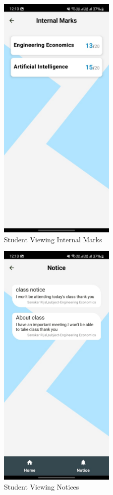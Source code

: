\begin{figure}[H]
    \centering
    \includegraphics[width=0.5\textwidth]{Graphics/output/student_marks.jpg}
    \caption{Student Viewing Internal Marks}
    \label{fig:student_marks}
\end{figure}

\begin{figure}[H]
    \centering
    \includegraphics[width=0.5\textwidth]{Graphics/output/student_notices.jpg}
    \caption{Student Viewing Notices}
    \label{fig:student_notices}
\end{figure}

